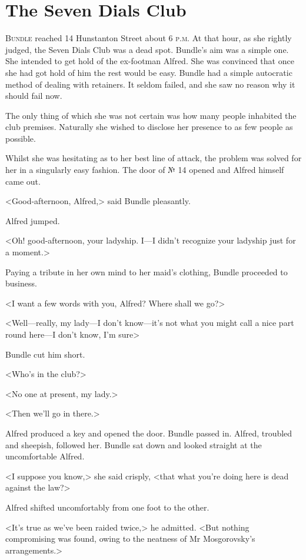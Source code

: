 \chapter{The Seven Dials Club}

\lettrine{B}{undle} reached 14 Hunstanton Street about 6 \textsc{p.m}. At that hour, as she rightly judged, the Seven Dials Club was a dead spot. Bundle's aim was a simple one. She intended to get hold of the ex-footman Alfred. She was convinced that once she had got hold of him the rest would be easy. Bundle had a simple autocratic method of dealing with retainers. It seldom failed, and she saw no reason why it should fail now.

The only thing of which she was not certain was how many people inhabited the club premises. Naturally she wished to disclose her presence to as few people as possible.

Whilst she was hesitating as to her best line of attack, the problem was solved for her in a singularly easy fashion. The door of № 14 opened and Alfred himself came out.

<Good-afternoon, Alfred,> said Bundle pleasantly.

Alfred jumped.

<Oh! good-afternoon, your ladyship. I—I didn't recognize your ladyship just for a moment.>

Paying a tribute in her own mind to her maid's clothing, Bundle proceeded to business.

<I want a few words with you, Alfred? Where shall we go?>

<Well—really, my lady—I don't know—it's not what you might call a nice part round here—I don't know, I'm sure\longdash>

Bundle cut him short.

<Who's in the club?>

<No one at present, my lady.>

<Then we'll go in there.>

Alfred produced a key and opened the door. Bundle passed in. Alfred, troubled and sheepish, followed her. Bundle sat down and looked straight at the uncomfortable Alfred.

<I suppose you know,> she said crisply, <that what you're doing here is dead against the law?>

Alfred shifted uncomfortably from one foot to the other.

<It's true as we've been raided twice,> he admitted. <But nothing compromising was found, owing to the neatness of Mr Mosgorovsky's arrangements.>

